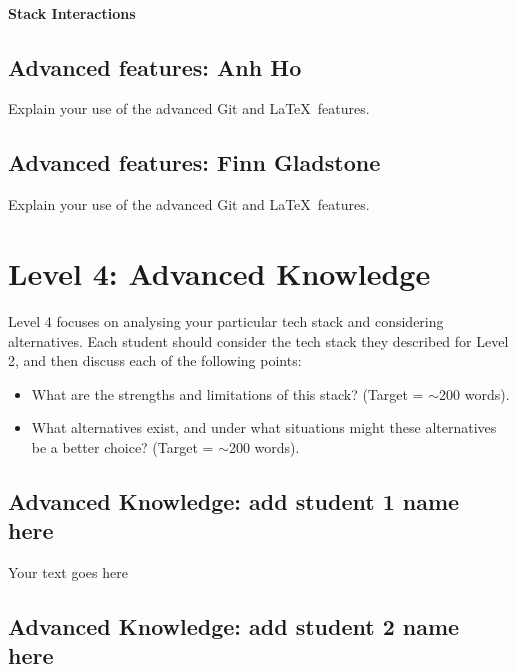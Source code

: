 \documentclass[a4paper, 11pt]{report}
\begin{document}
	
	\paragraph{Stack Interactions}
	
	
	\subsection{Advanced features: Anh Ho}
	
	Explain your use of the advanced Git and \LaTeX\ features. 
	
	\subsection{Advanced features: Finn Gladstone}
	
	Explain your use of the advanced Git and \LaTeX\ features. 
	
 
	
	
	
	
	\newpage
	\section{Level 4: Advanced Knowledge}
	
	Level 4 focuses on analysing your particular tech stack and considering alternatives. Each student should consider the tech stack they described for Level 2, and then discuss each of the following points:
	\begin{itemize}
		\item What are the strengths and limitations of this stack? (Target = $\sim$200 words).
		\item What alternatives exist, and under what situations might these alternatives be a better choice? (Target = $\sim$200 words).
	\end{itemize}
	
	\subsection{Advanced Knowledge: add student 1 name here}
	
	Your text goes here
	
	\subsection{Advanced Knowledge: add student 2 name here}
	
\end{document}
